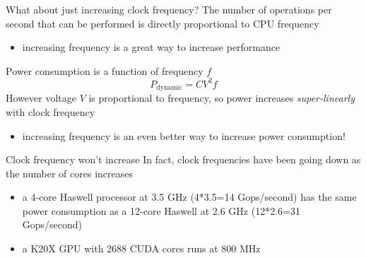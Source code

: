 \documentclass[aspectratio=43]{beamer}
\begin{document}
\begin{frame}[fragile]{}
    \begin{info}{What about just increasing clock frequency?}
        The number of operations per second that can be performed is directly proportional to CPU frequency
        \begin{itemize}
            \item increasing frequency is a great way to increase performance
        \end{itemize}
        Power consumption is a function of frequency $f$
        $$P_{\text{dynamic}}=CV^2f$$
        However voltage $V$ is proportional to frequency, so power increases \emph{super-linearly} with clock frequency
        \begin{itemize}
            \item increasing frequency is an even better way to increase power consumption!
        \end{itemize}
    \end{info}

\end{frame}

\begin{frame}[fragile]{}
    \begin{info}{Clock frequency won't increase}
        In fact, clock frequencies have been going down as the number of cores increases
        \begin{itemize}
            \item a 4-core Haswell processor at 3.5 GHz (4*3.5=14 Gops/second) has the same power consumption as a 12-core Haswell at 2.6 GHz (12*2.6=31 Gops/second)
            \item a K20X GPU with 2688 CUDA cores runs at 800 MHz
        \end{itemize}
    \end{info}
\end{frame}
\end{document}
